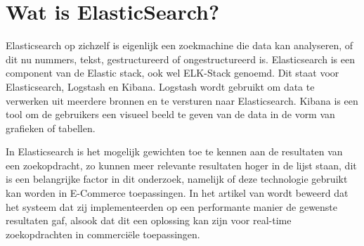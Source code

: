 \section{Wat is ElasticSearch?}
\label{sec:wat is ElasticSearch?}

Elasticsearch op zichzelf is eigenlijk een zoekmachine die data kan analyseren, of dit nu nummers, tekst, gestructureerd of ongestructureerd is. Elasticsearch is een component van de Elastic stack, ook wel ELK-Stack genoemd. Dit staat voor Elasticsearch, Logstash en Kibana. Logstash wordt gebruikt om data te verwerken uit meerdere bronnen en te versturen naar Elasticsearch. Kibana is een tool om de gebruikers een visueel beeld te geven van de data in de vorm van grafieken of tabellen.

In Elasticsearch is het mogelijk gewichten toe te kennen aan de resultaten van een zoekopdracht, zo kunnen meer relevante resultaten hoger in de lijst staan, dit is een belangrijke factor in dit onderzoek, namelijk of deze technologie gebruikt kan worden in E-Commerce toepassingen. In het artikel van \cite{Vavliakis2019} wordt beweerd dat het systeem dat zij implementeerden op een performante manier de gewenste resultaten gaf, alsook dat dit een oplossing kan zijn voor real-time zoekopdrachten in commerciële toepassingen.
